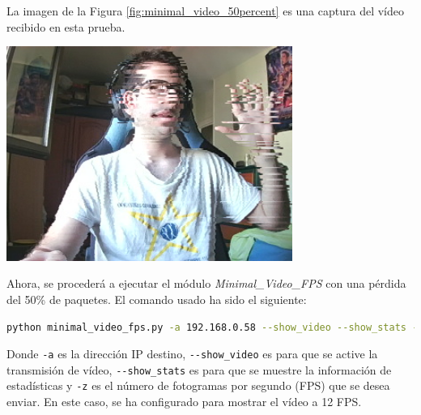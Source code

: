 \newpage
La imagen de la Figura \ref{fig:minimal_video_50percent} es una captura del vídeo recibido en esta prueba.
\begin{center}
  \includegraphics[width = 0.7\textwidth]{images/VideoRecibido9.1.png}
  \label{fig:minimal_video_50percent}
\end{center}

\newpage


Ahora, se procederá a ejecutar el módulo \textit{Minimal\_Video\_FPS} con una pérdida del 50\% de paquetes. El comando usado ha sido el siguiente:

\begin{lstlisting}[language=bash, basicstyle=\ttfamily\scriptsize]
    python minimal_video_fps.py -a 192.168.0.58 --show_video --show_stats -z 12
\end{lstlisting}
Donde \verb|-a| es la dirección IP destino, \verb|--show_video| es para que se active la transmisión de vídeo, \verb|--show_stats| es para que se muestre la información de estadísticas y \verb|-z| es el número de fotogramas por segundo (FPS) que se desea enviar. En este caso, se ha configurado para mostrar el vídeo a 12 FPS.
\vspace{\baselineskip}

